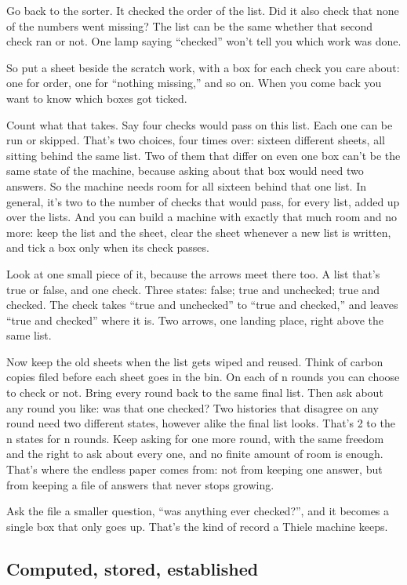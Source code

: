 \documentclass[11pt,twoside]{article}
\theoremstyle{thielethm}
\theoremstyle{thieledef}
\theoremstyle{thieledef}
\theoremstyle{thieledef}
\theoremstyle{thielethm}
\theoremstyle{thieleobs}
\theoremstyle{thielethm}
\begin{document}
Go back to the sorter. It checked the order of the list. Did it also check that none of the numbers went missing? The list can be the same whether that second check ran or not. One lamp saying ``checked'' won't tell you which work was done.

So put a sheet beside the scratch work, with a box for each check you care about: one for order, one for ``nothing missing,'' and so on. When you come back you want to know which boxes got ticked.

Count what that takes. Say four checks would pass on this list. Each one can be run or skipped. That's two choices, four times over: sixteen different sheets, all sitting behind the same list. Two of them that differ on even one box can't be the same state of the machine, because asking about that box would need two answers. So the machine needs room for all sixteen behind that one list. In general, it's two to the number of checks that would pass, for every list, added up over the lists. And you can build a machine with exactly that much room and no more: keep the list and the sheet, clear the sheet whenever a new list is written, and tick a box only when its check passes.

Look at one small piece of it, because the arrows meet there too. A list that's true or false, and one check. Three states: false; true and unchecked; true and checked. The check takes ``true and unchecked'' to ``true and checked,'' and leaves ``true and checked'' where it is. Two arrows, one landing place, right above the same list.

Now keep the old sheets when the list gets wiped and reused. Think of carbon copies filed before each sheet goes in the bin. On each of n rounds you can choose to check or not. Bring every round back to the same final list. Then ask about any round you like: was that one checked? Two histories that disagree on any round need two different states, however alike the final list looks. That's 2 to the n states for n rounds. Keep asking for one more round, with the same freedom and the right to ask about every one, and no finite amount of room is enough. That's where the endless paper comes from: not from keeping one answer, but from keeping a file of answers that never stops growing.

Ask the file a smaller question, ``was anything ever checked?'', and it becomes a single box that only goes up. That's the kind of record a Thiele machine keeps.

\subsection{Computed, stored, established}
\end{document}
